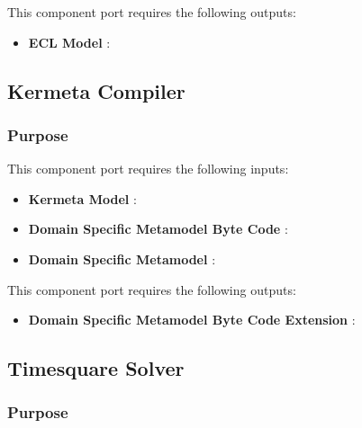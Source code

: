 \documentclass{gemoc} %
\begin{document}
This component port requires the following outputs:
\begin{itemize}
  \item \textbf{ECL Model} :
\end{itemize}

\subsection{Kermeta Compiler}


\subsubsection{Purpose}

This component port requires the following inputs:
\begin{itemize}
  \item \textbf{Kermeta Model} :
  \item \textbf{Domain Specific Metamodel Byte Code} :
  \item \textbf{Domain Specific Metamodel} :
\end{itemize}

This component port requires the following outputs:
\begin{itemize}
  \item \textbf{Domain Specific Metamodel Byte Code Extension} :
\end{itemize}

\subsection{Timesquare Solver}


\subsubsection{Purpose}
\end{document}

